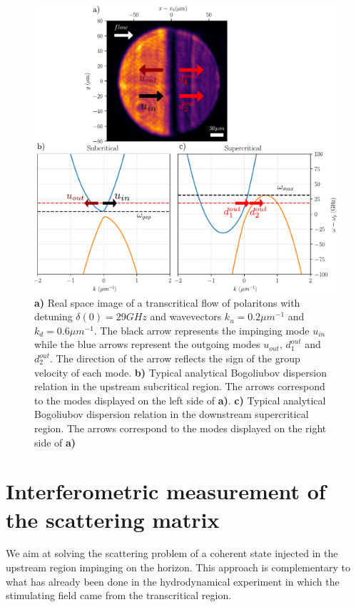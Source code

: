 \begin{figure}[htbp]
    \centering
    \includegraphics[width=1\textwidth]{chap_stimulated_hawking/fig/typical_dens_2D.pdf}
    \caption{\textbf{a)} Real space image of a transcritical flow of polaritons with detuning $\delta(0)=29 GHz$ and wavevectors $k_u=0.2 \mu m^{-1}$ and $k_d=0.6\mu m^{-1}$. The black arrow represents the impinging mode $u_{in}$ while the blue arrows represent the outgoing modes $u_{out}$, $d_1^{out}$ and $d_2^{out}$. The direction
    of the arrow reflects the sign of the group velocity of each mode.
    \textbf{b)} Typical analytical Bogoliubov dispersion relation in the upstream subcritical region. The arrows correspond to the modes displayed on the left side of \textbf{a)}. 
    \textbf{c)} Typical analytical Bogoliubov dispersion relation in the downstream supercritical region. The arrows correspond to the modes displayed on the right side of \textbf{a)}}
    \label{fig:typical_dens_2D}
\end{figure}


\section{Interferometric measurement of the scattering matrix }
\label{sec:principle_measurement}

We aim at solving the scattering problem of a coherent state injected in the upstream region impinging on the horizon.
This approach is complementary to what has already been done in the hydrodynamical experiment \cite{euve_scattering_2020} in which
the stimulating field came from the transcritical region.

